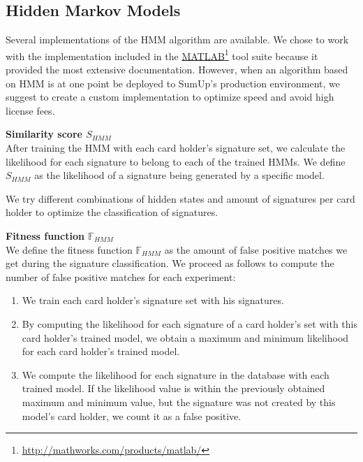 \documentclass[a4paper, oneside]{csthesis}
\newcommand\fnurl[2]{%
  \href{#2}{#1}\footnote{\url{#2}}%
}
\begin{document}
\newpage

\subsection{Hidden Markov Models}
\label{sec:hidden-markov-models}

Several implementations of the HMM algorithm are available. We chose to work with the implementation included in the \fnurl{MATLAB}{http://mathworks.com/products/matlab/} tool suite because it provided the most extensive documentation. However, when an algorithm based on HMM is at one point be deployed to SumUp's production environment, we suggest to create a custom implementation to optimize speed and avoid high license fees.

\textbf{Similarity score $S_{HMM}$}\\
After training the HMM with each card holder's signature set, we calculate the likelihood for each signature to belong to each of the trained HMMs. We define $S_{HMM}$ as the likelihood of a signature being generated by a specific model.

We try different combinations of hidden states and amount of signatures per card holder to optimize the classification of signatures.

\textbf{Fitness function $\mathbb{F}_{HMM}$}\\
We define the fitness function $\mathbb{F}_{HMM}$ as the amount of false positive matches we get during the signature classification. We proceed as follows to compute the number of false positive matches for each experiment:

\begin{enumerate}
\item We train each card holder's signature set with his signatures.
\item By computing the likelihood for each signature of a card holder's set with this card holder's trained model, we obtain a maximum and minimum likelihood for each card holder's trained model.
\item We compute the likelihood for each signature in the database with each trained model. If the likelihood value is within the previously obtained maximum and minimum value, but the signature was not created by this model's card holder, we count it as a false positive.
\end{enumerate}
\end{document}
